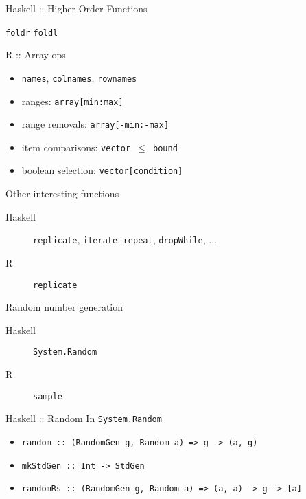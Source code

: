 \documentclass{beamer}
\begin{document}
\begin{frame}{Haskell :: Higher Order Functions}
  \begin{center}
  \end{center}
  \hspace{9em} \texttt{foldr} \hspace{5em} \texttt{foldl}
\end{frame}

\begin{frame}{R :: Array ops}
  \begin{itemize}
    \item \texttt{names}, \texttt{colnames}, \texttt{rownames}
    \item ranges: \texttt{array[min:max]}
    \item range removals: \texttt{array[-min:-max]}
    \item item comparisons: \texttt{vector $\le$ bound}
    \item boolean selection: \texttt{vector[condition]}
  \end{itemize}
\end{frame}

\begin{frame}{Other interesting functions}
  \begin{description}
    \item[Haskell] \texttt{replicate}, \texttt{iterate}, \texttt{repeat},
      \texttt{dropWhile}, $\ldots$
    \item[R] \texttt{replicate}
  \end{description}
\end{frame}

\begin{frame}{Random number generation}
  \begin{description}
    \item[Haskell] \texttt{System.Random}
    \item[R] \texttt{sample}
  \end{description}
\end{frame}

\begin{frame}{Haskell :: Random}
  In \texttt{System.Random}
  \begin{itemize}
    \item \texttt{random :: (RandomGen g, Random a) => g -> (a, g)}
    \item \texttt{mkStdGen :: Int -> StdGen}
    \item \texttt{randomRs :: (RandomGen g, Random a) => (a, a) -> g -> [a]}
  \end{itemize}
\end{frame}
\end{document}
